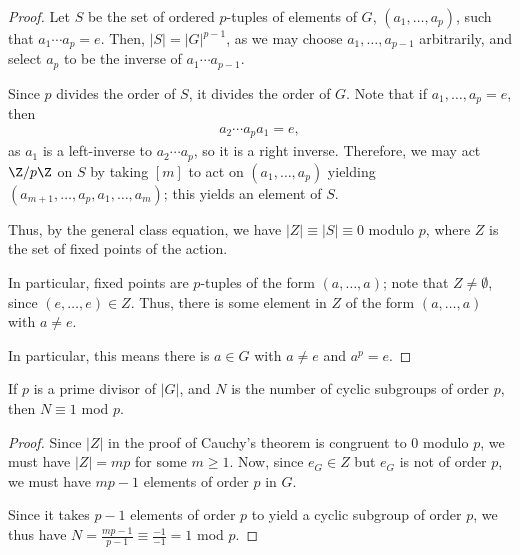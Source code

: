 \documentclass[10pt]{mypackage}
\begin{document}
\begin{proof}
  Let $S$ be the set of ordered $p$-tuples of elements of $G$, $\left( a_1,\dots,a_p \right)$, such that $a_1\cdots a_p = e$. Then, $\left\vert S \right\vert = \left\vert G \right\vert^{p-1}$, as we may choose $a_1,\dots,a_{p-1}$ arbitrarily, and select $a_p$ to be the inverse of $a_1\cdots a_{p-1}$.\newline

  Since $p$ divides the order of $S$, it divides the order of $G$. Note that if $a_1,\dots,a_p = e$, then
  \begin{align*}
    a_2\cdots a_pa_1 = e,
  \end{align*}
  as $a_1$ is a left-inverse to $a_2\cdots a_p$, so it is a right inverse. Therefore, we may act $\Z/p\Z$ on $S$ by taking $\left[ m \right]$ to act on $\left( a_1,\dots,a_p \right)$ yielding $\left( a_{m+1},\dots, a_p,a_1,\dots,a_m \right)$; this yields an element of $S$.\newline

  Thus, by the general class equation, we have $\left\vert Z \right\vert \equiv \left\vert S \right\vert \equiv 0$ modulo $p$, where $Z$ is the set of fixed points of the action.\newline

  In particular, fixed points are $p$-tuples of the form $\left( a,\dots,a \right)$; note that $Z\neq \emptyset$, since $\left( e,\dots,e \right)\in Z$. Thus, there is some element in $Z$ of the form $\left( a,\dots,a \right)$ with $a\neq e$.\newline

  In particular, this means there is $a\in G$ with $a\neq e$ and $a^p = e$.
\end{proof}
\begin{corollary}
  If $p$ is a prime divisor of $\left\vert G \right\vert$, and $N$ is the number of cyclic subgroups of order $p$, then $N\equiv 1$ mod $p$.
\end{corollary}
\begin{proof}
  Since $\left\vert Z \right\vert$ in the proof of Cauchy's theorem is congruent to $0$ modulo $p$, we must have $\left\vert Z \right\vert = mp$ for some $m \geq 1$. Now, since $e_G\in Z$ but $e_G$ is not of order $p$, we must have $mp - 1$ elements of order $p$ in $G$.\newline

  Since it takes $p-1$ elements of order $p$ to yield a cyclic subgroup of order $p$, we thus have $N = \frac{mp-1}{p-1}\equiv \frac{-1}{-1} = 1$ mod $p$.
\end{proof}
\end{document}
